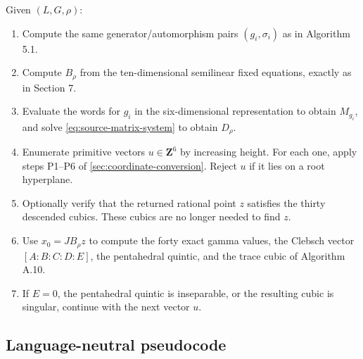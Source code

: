 \documentclass[11pt]{article}
\newcommand{\ZZ}{\mathbf{Z}}
\begin{document}
Given $(L,G,\rho)$:

\begin{enumerate}[label=\textbf{Step \arabic*.}]
\item Compute the same generator/automorphism pairs $(g_i,\sigma_i)$ as in
Algorithm 5.1.

\item Compute $B_\rho$ from the ten-dimensional semilinear fixed equations, exactly
as in Section 7.

\item Evaluate the words for $g_i$ in the six-dimensional representation to obtain
$M_{g_i}$, and solve \eqref{eq:source-matrix-system} to obtain $D_\rho$.

\item Enumerate primitive vectors $u\in\ZZ^6$ by increasing height.  For each one,
apply steps P1--P6 of \cref{sec:coordinate-conversion}.  Reject $u$ if it lies on a
root hyperplane.

\item Optionally verify that the returned rational point $z$ satisfies the thirty
descended cubics.  These cubics are no longer needed to find $z$.

\item Use $x_0=JB_\rho z$ to compute the forty exact gamma values, the Clebsch
vector $[A:B:C:D:E]$, the pentahedral quintic, and the trace cubic of Algorithm
A.10.

\item If $E=0$, the pentahedral quintic is inseparable, or the resulting cubic is
singular, continue with the next vector $u$.
\end{enumerate}

\subsection{Language-neutral pseudocode}
\end{document}
